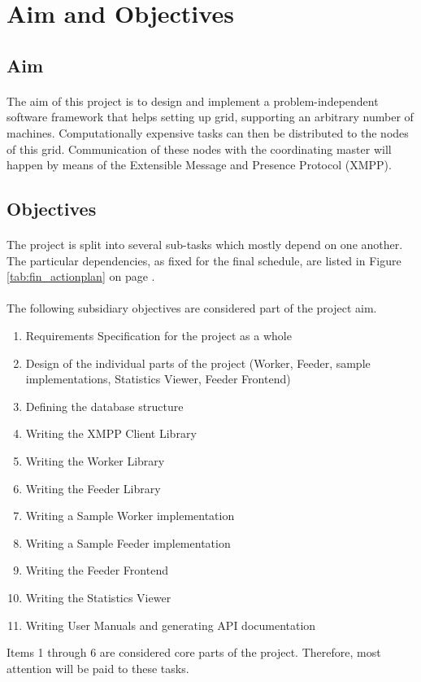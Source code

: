 \section{Aim and Objectives}

\subsection{Aim}
\paragraph{}
The aim of this project is to design and implement a prob\-lem-in\-de\-pen\-dent software framework that helps setting up grid, supporting an arbitrary number of machines. Computationally expensive tasks can then be distributed to the nodes of this grid. Communication of these nodes with the coordinating master will happen by means of the Extensible Message and Presence Protocol (XMPP).

\subsection{Objectives}
\paragraph{}
The project is split into several sub-tasks which mostly depend on one another. The particular dependencies, as fixed for the final schedule, are listed in Figure \ref{tab:fin_actionplan} on page \pageref{tab:fin_actionplan}.

\paragraph{}
The following subsidiary objectives are considered part of the project aim.
\begin{enumerate}
\item Requirements Specification for the project as a whole
\item Design of the individual parts of the project (Worker, Feeder, sample implementations, Statistics Viewer, Feeder Frontend)
\item Defining the database structure
\item Writing the XMPP Client Library
\item Writing the Worker Library
\item Writing the Feeder Library
\item Writing a Sample Worker implementation
\item Writing a Sample Feeder implementation
\item Writing the Feeder Frontend
\item Writing the Statistics Viewer
\item Writing User Manuals and generating API documentation
\end{enumerate}
Items 1 through 6 are considered core parts of the project. Therefore, most attention will be paid to these tasks.
